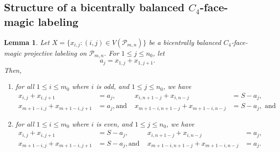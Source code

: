 \documentclass[12pt]{amsart}
\theoremstyle{definition}
\theoremstyle{plain}
\newtheorem{lemma}[definition]{Lemma}
\begin{document}
\subsection{Structure of a bicentrally balanced $C_4$-face-magic labeling}


\begin{lemma} \label{lemmaStructureOfBicentrallyBalancedLabeling}
   Let $X=\{x_{i,j}:(i,j)\in V(\mathcal{P}_{m,n})\}$ be a bicentrally balanced $C_4$-face-magic projective labeling on $\mathcal{P}_{m,n}$.
   For $1 \leqslant j \leqslant n_0$, let
   \begin{equation*}
     a_j = x_{1,j} +x_{1,j+1}.
   \end{equation*}
   Then,
   \begin{enumerate}
     \item for all $1 \leqslant i \leqslant m_0$ where $i$ is odd, and $1 \leqslant j \leqslant n_0$, we have
     \begin{align*}
       x_{i,j} + x_{i,j+1} &= a_j,                      &x_{i,n+1-j} + x_{i,n-j} &= S- a_j,  \\
       x_{m+1-i,j} + x_{m+1-i,j+1} &= a_j,  \mbox{and } &x_{m+1-i,n+1-j} + x_{m+1-i,n-j} &= S- a_j, \mbox{\ \ and }
     \end{align*}
     \item for all $1 \leqslant i \leqslant m_0$ where $i$ is even, and $1 \leqslant j \leqslant n_0$, we have
     \begin{align*}
       x_{i,j} + x_{i,j+1} &= S- a_j,                      &x_{i,n+1-j} + x_{i,n-j} &= a_j,  \\
       x_{m+1-i,j} + x_{m+1-i,j+1} &= S-a_j,  \mbox{and } &x_{m+1-i,n+1-j} + x_{m+1-i,n-j} &= a_j.
     \end{align*}
   \end{enumerate}
\end{lemma}
\end{document}

